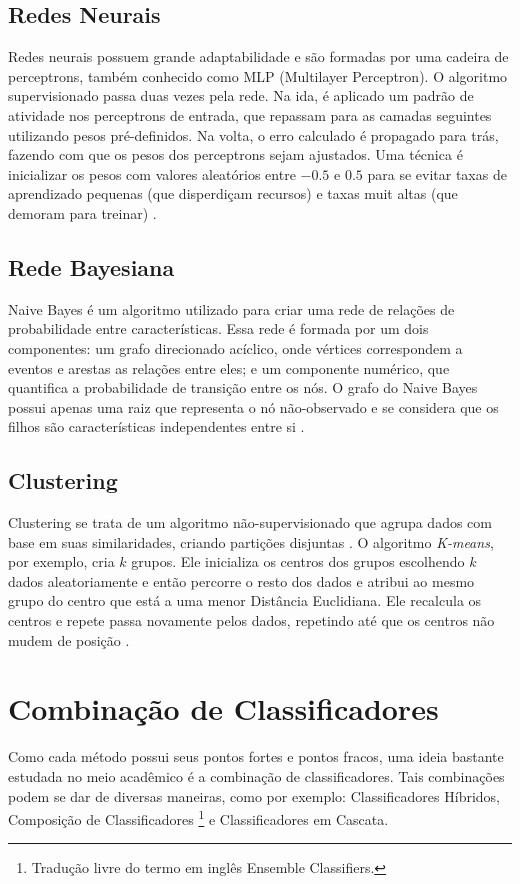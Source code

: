     \subsection{Redes Neurais}
    Redes neurais possuem grande adaptabilidade e são formadas por uma cadeira de perceptrons, também conhecido como MLP
    (Multilayer Perceptron). O algoritmo supervisionado passa duas vezes pela rede. Na ida, é aplicado um padrão de
    atividade nos perceptrons de entrada, que repassam para as camadas seguintes utilizando pesos pré-definidos. Na volta,
     o erro calculado é propagado para trás, fazendo com que os pesos dos perceptrons sejam ajustados.
     Uma técnica é inicializar os pesos com valores aleatórios entre $-0.5$ e $0.5$ para se evitar taxas de aprendizado
     pequenas (que disperdiçam recursos) e taxas muit altas (que demoram para treinar) \cite{barapatre08}.

    \subsection{Rede Bayesiana}
    Naive Bayes é um algoritmo utilizado para criar uma rede de relações de probabilidade entre características. Essa
    rede é formada por um dois componentes: um grafo direcionado acíclico, onde vértices correspondem a eventos e
    arestas as relações entre eles; e um componente numérico, que quantifica a probabilidade de transição entre os nós.
    O grafo do Naive Bayes possui apenas uma raiz que representa o nó não-observado e se considera que os filhos
    são características independentes entre si \cite{benferhat05}.

    \subsection{Clustering}
     Clustering se trata de um algoritmo não-supervisionado que agrupa dados com base em suas similaridades, criando
      partições disjuntas \cite{ni07}. O algoritmo \emph{K-means}, por exemplo, cria $k$ grupos. Ele inicializa os centros
      dos grupos escolhendo $k$ dados aleatoriamente e então percorre o resto dos dados e atribui ao mesmo grupo do
      centro que está a uma menor Distância Euclidiana. Ele recalcula os centros e repete passa novamente pelos dados,
      repetindo até que os centros não mudem de posição \cite{zhang09}.

\section{Combinação de Classificadores}
Como cada método possui seus pontos fortes e pontos fracos, uma ideia bastante estudada no meio acadêmico é a
 combinação de classificadores. Tais combinações podem se dar de diversas maneiras, como por exemplo: Classificadores
 Híbridos, Composição de Classificadores \footnote{Tradução livre do termo em inglês Ensemble Classifiers.} e
 Classificadores em Cascata.

